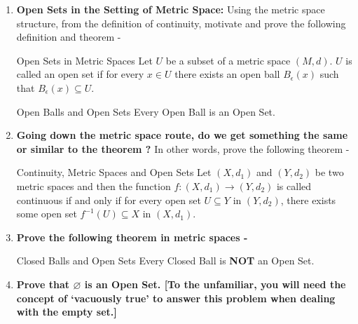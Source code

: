 \begin{enumerate}[label=\textbf{\arabic*.}]
    \item \textbf{Open Sets in the Setting of Metric Space:} Using the metric space structure, from the definition of continuity, motivate and prove the following definition and theorem -
    \begin{Definition}{Open Sets in Metric Spaces}\label{open_sets_metric}
         Let $U$ be a subset of a metric space $(M,d)$. $U$ is called an open set if for every $x\in U$ there exists an open ball $B_{\epsilon}(x)$ such that $B_{\epsilon}(x)\subseteq U$.
    \end{Definition}
    \begin{Theorem}{Open Balls and Open Sets}\label{open_sets_open_balls}
        Every Open Ball is an Open Set.
    \end{Theorem}
    \item \textbf{Going down the metric space route, do we get something the same or similar to the theorem \pmb{\eqref{con_open_sets_in_R}}?} In other words, prove the following theorem -
    \begin{Theorem}{Continuity, Metric Spaces and Open Sets}\label{con_metric_open}
        Let $(X,d_1)$ and $(Y,d_2)$ be two metric spaces and then the function $f:(X,d_1)\rightarrow(Y,d_2)$
        is called continuous if and only if for every open set $U\subseteq Y$ in $(Y,d_2)$, there exists some open set $f^{-1}(U)\subseteq X$ in $(X,d_1)$.
    \end{Theorem}
    \item \textbf{Prove the following theorem in metric spaces -}
    \begin{Theorem}{Closed Balls and Open Sets}\label{closed_balls_open_sets}
        Every Closed Ball is \textbf{NOT} an Open Set.
    \end{Theorem}
    \item \textbf{ Prove that $\pmb{\varnothing}$ is an Open Set. [To the unfamiliar, you will need the concept of `vacuously true' to answer this problem when dealing with the empty set.]}
\end{enumerate}
